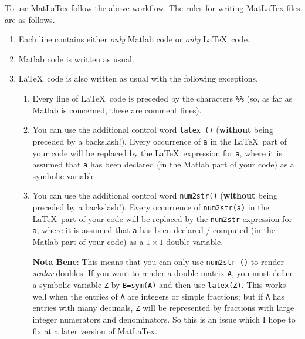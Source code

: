 \documentclass{article}
\begin{document}
  \noindent To use \textsf{MatLaTex} follow the above  workflow. 
  The rules for writing \textsf{MatLaTex} files are as follows. 
  \begin{enumerate} 
  \item Each line contains either \emph{only} \textsf{Matlab} code  or \emph{only} \LaTeX\ code.  
  \item \textsf{Matlab} code is written as usual. 
  \item \LaTeX\ code is also written as usual with the following exceptions.  
  \begin{enumerate} 
  \item Every line of \LaTeX\ code is preceded by the characters \texttt{\%\%}  
  (so, as far as \textsf{Matlab} is concerned, these 
  are comment lines). 
  \item You can use the additional control word \texttt{latex (\;)} (\textbf{without} being preceded by a backslash!).  
  Every occurrence of \texttt{a} in the \LaTeX\  part of your code will be replaced  
  by the \LaTeX\  expression for \texttt{a}, 
  where it is assumed that \texttt{a} has been declared (in the \textsf{Matlab} part of your code) as a symbolic variable. 
  \item You can use the additional control word \texttt{num2str(\;)} (\textbf{without} being preceded by a backslash!). 
  Every occurrence of \texttt{num2str(a)} in the \LaTeX\ part of your code will  
  be replaced by the \texttt{num2str}  expression for  \texttt{a}, 
  where it is assumed that \texttt{a} has been declared / computed (in the \textsf{Matlab} part of your code)  
  as a $1\times 1$ double variable.  
  
  \medskip  
   
  \noindent\textbf{Nota Bene}: 
  This means that you can only use \texttt{num2str (\;)} to render \emph{scalar} doubles. If you want  
  to render a double matrix \texttt{A}, 
  you must define a symbolic variable \texttt{Z} by \texttt{B=sym(A)} and then use \texttt{latex(Z)}. This works well when  
  the entries of \texttt{A} are integers or simple fractions; but if \texttt{A} has entries with many decimals, 
  \texttt{Z}  will be represented by fractions with large integer numerators and denominators. So this  
  is an issue which I hope to fix at a later version of \textsf{MatLaTex}. 
  
  \end{enumerate}   
  \end{enumerate}   
  
\end{document}
